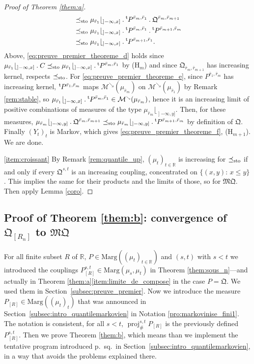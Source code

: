 \documentclass[JEP,XML,SOM,Unicode,NoEqCountersInSection,NoFloatCountersInSection,published]{cedram}
\newcommand{\ldot}{\mathbin{.}}
\theoremstyle{plain}
\theoremstyle{definition}
\newcommand{\como}{\mathfrak{Q}}
\newcommand{\mq}{\mathfrak{MQ}}
\let\mb\relax
\let\mn\relax
\newcommand{\trans}{{}^{\mathrm{t}}\mkern-1mu}
\newcommand{\ma}{\mathrm{Marg}}
\newcommand{\R}{\mathbb{R}}
\newcommand{\leqs}{\preceq_{\text{\rm sto}}}
\newcommand{\pr}{\operatorname{proj}}
\newcommand{\mdec}{\mathcal{M}^{\scriptscriptstyle\searrow}}
\newcommand{\op}{\mathopen}
\begin{document}
\begin{proof}[Proof of Theorem \ref{them:a}]
\begin{align}
&\leqs\mu_{\bar r_1}\lfloor_{\op]-\infty,x]}{}\ldot\trans P^{\bar r_m,\bar r_1}{}\ldot\como^{\bar r_{m},\bar r_{m+1}}\label{eq:preuve_premier_theoreme_d}\\
&\leqs \mu_{\bar r_1}\lfloor_{\op]-\infty,x]}{}\ldot\trans P^{\bar r_m,\bar r_1}{}\ldot\trans P^{\bar r_{m+1},\bar r_m}\label{eq:preuve_premier_theoreme_e}\\
&\leqs \mu_{\bar r_1}\lfloor_{\op]-\infty,x]}{}\ldot\trans P^{\bar r_{m+1},\bar r_1}\label{eq:preuve_premier_theoreme_f}.
\end{align}
Above, \eqref{eq:preuve_premier_theoreme_d} holds since $\mu_{\bar r_1}\lfloor_{\op]-\infty,x]}{}\ldot C\leqs\mu_{\bar r_1}\lfloor_{\op]-\infty,x]}{}\ldot\trans P^{\bar r_m,\bar r_1}$ by (H$_m$) and since $\como_{\bar r_{m},\bar r_{m+1}}$ has increasing kernel, \ie respects $\leqs$. For \eqref{eq:preuve_premier_theoreme_e}, since $P^{\bar r_1,\bar r_m}$ has increasing kernel, $\trans P^{\bar r_1,\bar r_m}$ maps $\mdec(\mu_{\bar r_m})$ on $\mdec(\mu_{\bar r_1})$ by Remark \ref{rem:stable}, so $\mu_{\bar r_1}\lfloor_{\op]-\infty,x]}{}\ldot\trans P^{\bar r_m,\bar r_1}\in\mdec(\mu_{\bar r_m})$, hence it is an increasing limit of positive combinations of measures of the type $\mu_{\bar r_m}\lfloor_{\op]-\infty,y]}$. Then, for these measures, $\mu_{\bar r_m}\lfloor_{\op]-\infty,y]}{}\ldot\como^{\bar r_m,\bar r_{m+1}}\leqs\mu_{\bar r_m}\lfloor_{\op]-\infty,y]}{}\ldot\trans P^{\bar r_{m+1},\bar r_m}$ by definition of $\como$. Finally $(Y_t)_t$ is Markov, which gives \eqref{eq:preuve_premier_theoreme_f}, \ie (H$_{m+1}$). We are done. 

\eqref{item:croissant}
By Remark \ref{rem:quantile_up}, $(\mu_t)_{t\in\R}$ is increasing for $\leqs$ if and only if every $\como^{s,t}$ is an increasing coupling, \ie concentrated on $\{(x,y):\,x\leqslant y\}$. This implies the same for their products and the limits of those, so for $\mq$. Then apply Lemma \ref{coro}.
\end{proof}

\subsection{Proof of Theorem \ref{them:b}: convergence of \mb$\como_{[R_n]}$ to $\mq$\mn}\label{subsec:preuve_deuxieme} For all finite subset $R$ of $\R$, $P\in\ma((\mu_t)_{t\in\R})$ and $(s,t)$ with $s<t$ we introduced the couplings $P_{[R]}^{s,t}\in\ma(\mu_s,\mu_t)$ in Theorem \ref{them:sous_n}---and actually in Theorem \ref{them:a}\eqref{item:limite_de_compose} in the case $P=\como$. We used them in Section~\ref{subsec:preuve_premier}. Now we introduce the measure $P_{[R]}\in\ma((\mu_t)_{t})$ that was announced in Section~\ref{subsec:intro_quantilemarkovien} in Notation \ref{pro:markovinise_fini1}. The notation is consistent, \ie for all $s<t$, $\pr^{s,t}_\#P_{[R]}$ is the previously defined $P_{[R]}^{s,t}$. Then we prove Theorem \ref{them:b}, which means than we implement the tentative program introduced p.\,\pageref{page:tentative_limite} sq.\ in Section~\ref{subsec:intro_quantilemarkovien}, in a way that avoids the problems explained there.
\end{document}
